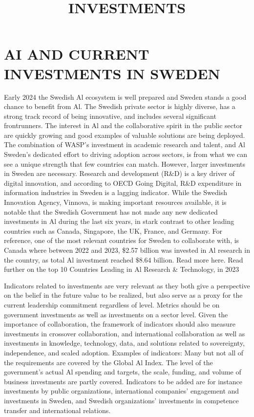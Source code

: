 \section*{AI AND CURRENT INVESTMENTS IN SWEDEN}
Early 2024 the Swedish Al ecosystem is well prepared and Sweden stands a good chance to benefit from Al. The Swedish private sector is highly diverse, has a strong track record of being innovative, and includes several significant frontrunners. The interest in Al and the collaborative spirit in the public sector are quickly growing and good examples of valuable solutions are being deployed. The combination of WASP's investment in academic research and talent, and Al Sweden's dedicated effort to driving adoption across sectors, is from what we can see a unique strength that few countries can match.
However, larger investments in Sweden are necessary. Research and development (R\&D) is a key driver of digital innovation, and according to OECD Going Digital, R\&D expenditure in information industries in Sweden is a lagging indicator.
While the Swedish Innovation Agency, Vinnova, is making important resources available, it is notable that the Swedish Government has not made any new dedicated investments in Al during the last six years, in stark contrast to other leading countries such as Canada, Singapore, the UK, France, and Germany.
For reference, one of the most relevant countries for Sweden to collaborate with, is Canada where between 2022 and 2023, \$2.57 billion was invested in Al research in the country, as total Al investment reached \(\$ 8.64\) billion. Read more here.
Read further on the top 10 Countries Leading in Al Research \& Technology, in 2023

\title{
INVESTMENTS
}
Indicators related to investments are very relevant as they both give a perspective on the belief in the future value to be realized, but also serve as a proxy for the current leadership commitment regardless of level. Metrics should be on government investments as well as investments on a sector level.
Given the importance of collaboration, the framework of indicators should also measure investments in crossover collaboration, and international collaboration as well as investments in knowledge, technology, data, and solutions related to sovereignty, independence, and scaled adoption.
Examples of indicators:
Many but not all of the requirements are covered by the Global Al Index. The level of the government's actual Al spending and targets, the scale, funding, and volume of business investments are partly covered. Indicators to be added are for instance investments by public organizations, international companies' engagement and investments in Sweden, and Swedish organizations' investments in competence transfer and international relations.
